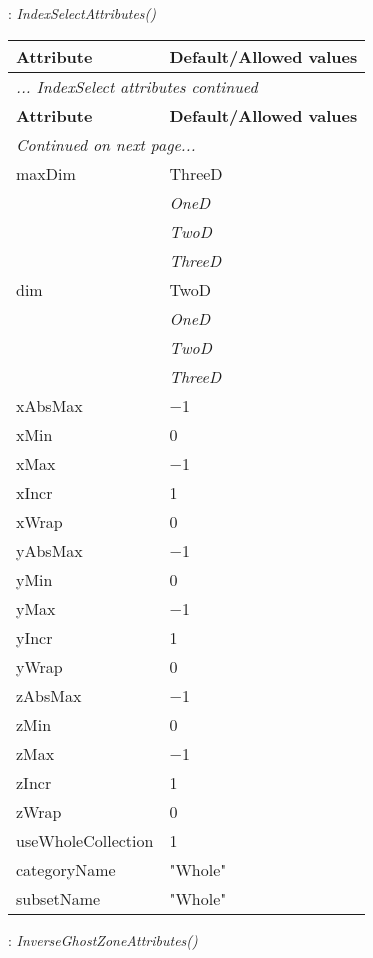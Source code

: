 \documentclass[10pt,a4paper]{report}
\begin{document}
\newpage

{}
: {\it IndexSelectAttributes() }\\[-3mm]

\begin{longtable}{ll}
{\bf Attribute} & {\bf Default/Allowed values} \\
\hline \hline
\endfirsthead
\multicolumn{2}{l}{{\it ... IndexSelect attributes continued}} \\
{\bf Attribute} & {\bf Default/Allowed values} \\
\hline \hline
\endhead
\hline
\multicolumn{2}{l}{{\it Continued on next page...}} \\
\endfoot
\hline
\endlastfoot

maxDim  &  ThreeD   \\
 & {\it  OneD} \\
 & {\it  TwoD} \\
 & {\it  ThreeD} \\
dim  &  TwoD   \\
 & {\it  OneD} \\
 & {\it  TwoD} \\
 & {\it  ThreeD} \\
xAbsMax  &  $-$1 \\
xMin  &  0 \\
xMax  &  $-$1 \\
xIncr  &  1 \\
xWrap  &  0 \\
yAbsMax  &  $-$1 \\
yMin  &  0 \\
yMax  &  $-$1 \\
yIncr  &  1 \\
yWrap  &  0 \\
zAbsMax  &  $-$1 \\
zMin  &  0 \\
zMax  &  $-$1 \\
zIncr  &  1 \\
zWrap  &  0 \\
useWholeCollection  &  1 \\
categoryName  &  "Whole" \\
subsetName  &  "Whole" \\
\end{longtable}

\newpage

{}
: {\it InverseGhostZoneAttributes() }\\[-3mm]
\end{document}
